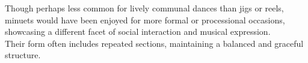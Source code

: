 \begin{multicols}{2}
{      Though perhaps less common for lively communal dances than jigs or reels, 
      minuets would have been enjoyed for more formal or processional occasions, 
      showcasing a different facet of social interaction and musical expression.\\ 
      
      Their form often includes repeated sections, maintaining a balanced and graceful structure.
    }

    \end{multicols}